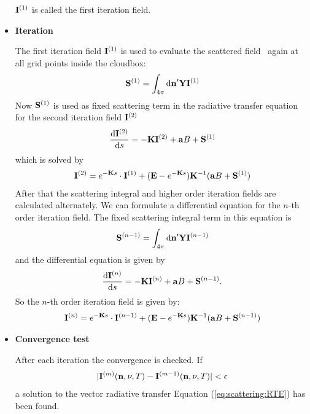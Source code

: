 \begin{itemize}
${\bf I}^{(1)}$ is called the first iteration field.


\item {\bf Iteration}

The first iteration field ${\bf I}^{(1)}$ is used to evaluate the
scattered field \ScaInt\ again at all grid points inside the cloudbox:
\begin{eqnarray}
  {\bf S}^{(1)} = \int_{4\pi} \mathrm{d} {\bf n}^\prime
  {\bf Y} {\bf I}^{(1)} 
\end{eqnarray}
Now ${\bf S}^{(1)}$ is used as fixed scattering term in the radiative
transfer equation for the second iteration field ${\bf I}^{(2)}$
\begin{eqnarray}
     \frac{\mathrm{d} {\bf I}^{(2)}}{\mathrm{d} s} =
     -{\bf K} {\bf I}^{(2)} + {\bf a} B
     +{\bf S}^{(1)}
\end{eqnarray} 
which is solved by
\begin{eqnarray}
   {\bf I}^{(2)} = e^{-{\bf K} s}\cdot{\bf I}^{(1)} + ({\bf E} - e^{-{\bf K}
    s}) {\bf K}^{-1} ({\bf a} B + {\bf S}^{(1)})
\end{eqnarray}
After that the scattering integral and higher order iteration fields
are calculated alternately. We can formulate a differential equation
for the $n$-th order iteration field. The fixed scattering integral
term in this equation is 
 \begin{eqnarray}
  {\bf S}^{(n-1)} = \int_{4\pi} \mathrm{d} {\bf n}^\prime
  {\bf Y} {\bf I}^{(n-1)}
\end{eqnarray}
and the differential equation is given by
\begin{eqnarray}
     \frac{\mathrm{d} {\bf I}^{(n)}}{\mathrm{d} s} =
     -{\bf K} {\bf I}^{(n)} + {\bf a} B
     +{\bf S}^{(n-1)}.
\end{eqnarray} 
So the  $n$-th order iteration field is given by:
\begin{eqnarray}
   {\bf I}^{(n)} = e^{-{\bf K} s}\cdot{\bf I}^{(n-1)} + ({\bf E} - e^{-{\bf K}
    s}) {\bf K}^{-1} ({\bf a} B + {\bf S}^{(n-1)})
\end{eqnarray}


\item {\bf Convergence test}

After each iteration the convergence is checked. If 
\begin{eqnarray}
|{\bf I}^{(m)} ({\bf n}, \nu, T) -  {\bf I}^{(m-1)} ({\bf n}, \nu, T)| < {\bf \epsilon}
\end{eqnarray}
a solution to the vector radiative transfer Equation (\ref{eq:scattering:RTE})
has been
found. 
\end{itemize}


